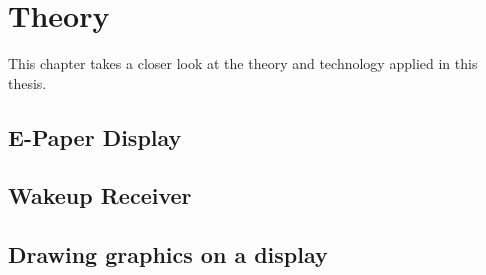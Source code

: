 \chapter{Theory}\label{theory}
This chapter takes a closer look at the theory and technology applied in this thesis.

\section{E-Paper Display}


\section{Wakeup Receiver}


\section{Drawing graphics on a display}
\label{chapter:DrawGraph}
